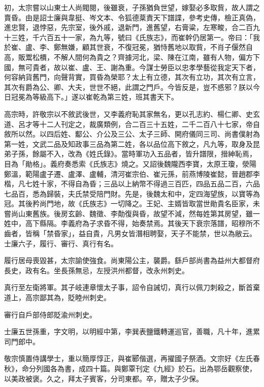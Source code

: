 \begin{pinyinscope}
 初，太宗嘗以山東士人尚閥閱，後雖衰，子孫猶負世望，嫁娶必多取貲，故人謂之賣昏。由是詔士廉與韋挺、岑文本、令狐德棻責天下譜諜，參考史傳，檢正真偽，進忠賢，退悖惡，先宗室，後外戚，退新門，進舊望，右膏粱，左寒畯，合二百九十三姓，千六百五十一家，為九等，號曰《氏族志》，而崔幹仍居第一。帝曰：「我於崔、盧、李、鄭無嫌，顧其世衰，不復冠冕，猶恃舊地以取貲，不肖子偃然自高，販鬻松檟，不解人間何為貴之？齊據河北，梁、陳在江南，雖有人物，偏方下國，無可貴者，故以崔、盧、王、謝為重。今謀士勞臣以忠孝學藝從我定天下者，何容納貨舊門，向聲背實，買昏為榮耶？太上有立德，其次有立功，其次有立言，其次有爵為公、卿、大夫，世世不絕，此謂之門戶。今皆反是，豈不惑邪？朕以今日冠冕為等級高下。」遂以崔乾為第三姓，班其書天下。



 高宗時，許敬宗以不敘武後世，又李義府恥其家無名，更以孔志約、楊仁卿、史玄道、呂才等十二人刊定之，裁廣類例，合二百三十五姓，二千二百八十七家，帝自敘所以然。以四后姓、酅公、介公及三公、太子三師、開府儀同三司、尚書僕射為第一姓，文武二品及知政事三品為第二姓，各以品位高下敘之，凡九等，取身及昆弟子孫，餘屬不入，改為《姓氏錄》。當時軍功入五品者，皆升譜限，搢紳恥焉，目為「勛格」。義府奏悉索《氏族志》燒之。又詔後魏隴西李寶，太原王瓊，滎陽鄭溫，範陽盧子遷、盧澤、盧輔，清河崔宗伯、崔元孫，前燕博陵崔懿，晉趙郡李楷，凡七姓十家，不得自為昏；三品以上納幣不得過三百匹，四品五品二百，六品七品百，悉為歸裝，夫氏禁受陪門財。先是，後魏太和中，定四海望族，以寶等為冠。其後矜尚門地，故《氏族志》一切降之。王妃、主婿皆取當世勛貴名臣家，未嘗尚山東舊族。後房玄齡、魏徵、李勣復與昏，故望不減，然每姓第其房望，雖一姓中，高下縣隔。李義府為子求昏不得，始奏禁焉。其後天下衰宗落譜，昭穆所不齒者，皆稱「禁昏家」，益自貴，凡男女皆潛相聘娶，天子不能禁，世以為敝云。士廉六子，履行、審行、真行有名。



 履行居母喪毀甚，太宗諭使強食。尚東陽公主，襲爵。繇戶部尚書為益州大都督府長史，政有名。坐長孫無忌，左授洪州都督，改永州刺史。



 真行至左衛將軍。其子岐連章懷太子事，詔令自誡切，真行以佩刀刺殺之，斷首棄道上，高宗鄙其為，貶睦州刺史。



 審行自戶部侍郎貶渝州刺史。



 士廉五世孫重，字文明，以明經中第，李巽表鹽鐵轉運巡官，善職，凡十年，進累司門郎中。



 敬宗慎置侍講學士，重以簡厚惇正，與崔郾偕選，再擢國子祭酒。文宗好《左氏春秋》，命分列國各為書，成四十篇。與鄭覃刊定《九經》於石。出為鄂岳觀察使，以美政被褒。久之，拜太子賓客，分司東都。卒，贈太子少保。




\end{pinyinscope}
